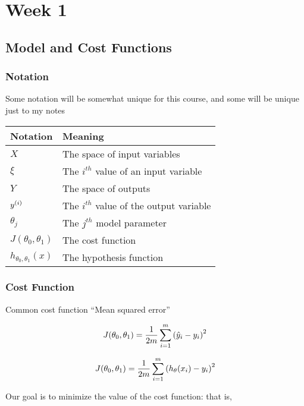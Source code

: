\chapter{Week 1}

\section{Model and Cost Functions}

\subsection{Notation}

Some notation will be somewhat unique for this course, and some will be unique just to my notes

\begin{center}
  \begin{tabular}{l l}
    \hline
    Notation                    & Meaning \\
    \hline
    $X$                         & The space of input variables \\
    $\xi$                       & The $i^{th}$ value of an input variable \\
    $Y$                         & The space of outputs \\
    $y^{(i)}$                       & The $i^{th}$ value of the output variable \\
    $\theta_j$                  & The $j^{th}$ model parameter \\
    $J(\theta_0, \theta_1)$     & The cost function \\
    $h_{\theta_0, \theta_1}(x)$ & The hypothesis function \\
    \hline
  \end{tabular}
\end{center}

\subsection{Cost Function}

Common cost function ``Mean squared error''

\[  J(\theta_0, \theta_1) = \frac{1}{2m} \sum_{i=1}^m \qty(\hat{y}_i - y_i)^2 \]

\[  J(\theta_0, \theta_1) = \frac{1}{2m} \sum_{i=1}^m \qty(h_\theta(x_i) - y_i)^2 \]

Our goal is to minimize the value of the cost function: that is,

